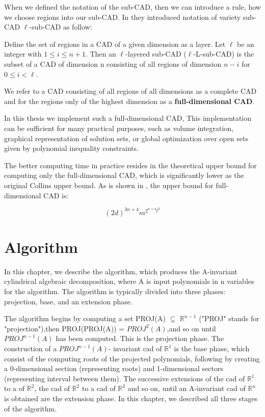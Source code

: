 \documentclass[
  digital, %
  twoside, %
  table,   %
  nolof,     %
  nolot,     %
]{fithesis3}
\begin{document}
When we defined the notation of the sub-CAD, then we can introduce a rule, how we choose regions into our sub-CAD. In  they introduced notation of variety sub-CAD $\ell$-sub-CAD as follow:

\begin{definition}
Define the set of regions in a CAD of a given dimension as a layer. Let $\ell$ be an integer with 
$1 \leq i \leq n+1$.
Then an $\ell$-layered sub-CAD ($\ell$-L-sub-CAD) is the subset of a CAD of dimension n consisting of all regions of dimension $n - i$ for $0 \leq i < \ell$. 
\end{definition}

We refer to a CAD consisting of all regions of all dimensions as a complete CAD and for the regions only of the highest dimension as a \textbf{full-dimensional CAD}.

In this thesis we implement such a  full-dimensional CAD, This implementation can be sufficient for many practical purposes, such as volume integration, graphical representation of solution sets, or global optimization over open sets given by polynomial inequality constraints.\cite{STRZEBONSKI2000471}

The better computing time in practice resides in the theoretical upper bound for computing only the full-dimensional CAD, which is significantly lower as the original Collins upper bound. As is shown in  , the upper bound for full-dimensional CAD is:

\begin{equation}
    (2d)^{3n+4}m^{2^{n + 4}l^3}
\end{equation}




\chapter{Algorithm}
In this chapter, we describe the algorithm, which produces the A-invariant cylindrical algebraic decomposition, where A is input polynomials in n variables for the algorithm. The algorithm is typically divided into three phases: projection, base, and an extension phase.

The algorithm begins by computing a set PROJ(A) $\subseteq$ $\mathbb{R}^{n-1}$ ("PROJ"
stands for "projection"),then PROJ(PROJ(A)) = $PROJ^2(A)$,and so on  until $PROJ^{n-1}(A)$ has been
computed. This is the projection phase. The construction of a  $PROJ^{n-1}(A)$-
invariant cad of $\mathbb{R}^1$ is the base phase, which consist of the computing roots of the projected polynomials, following by creating a 0-dimensional section (representing roots) and 1-dimensional sectors (representing interval between them).   The successive extensions of the cad
of $\mathbb{R}^1$ to a of $\mathbb{R}^2$, the cad of $\mathbb{R}^2$ to a cad of $\mathbb{R}^3$ and so on, until an A-invariant cad of $\mathbb{R}^n$ is obtained are the extension phase. \cite{Arnon:1984:CAD:2054.2069}
In this chapter, we described all three stages of the algorithm.
\end{document}
